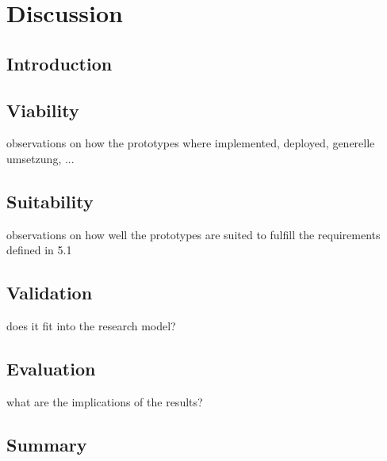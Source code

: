 \chapter{Discussion}


\section{Introduction}


\section{Viability}

observations on how the prototypes where implemented, deployed, generelle umsetzung, ...


\section{Suitability}

observations on how well the prototypes are suited to fulfill the requirements defined in 5.1


\section{Validation}

does it fit into the research model?


\section{Evaluation}

what are the implications of the results?


\section{Summary}
